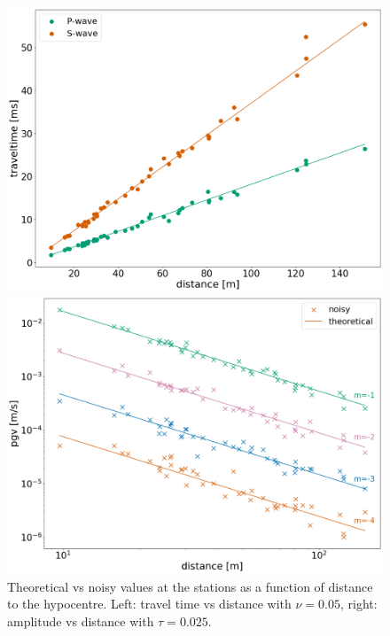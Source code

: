\documentclass{scrreprt}
\begin{document}
\begin{figure}[ht]
    \centering
    \begin{minipage}{0.49\textwidth}
        \centering
        \includegraphics[width=\textwidth]{plots/noise_traveltime.png}
    \end{minipage}
    \hfill
    \begin{minipage}{0.49\textwidth}
        \centering
        \includegraphics[width=\textwidth]{plots/noise_amplitude.png}

    \end{minipage}
    \caption{\label{fig:noise}Theoretical vs noisy values at the stations as a function of distance to the hypocentre. Left: travel time vs distance with $\nu=0.05$, right: amplitude vs distance with $\tau=0.025$. }
\end{figure}
\end{document}
